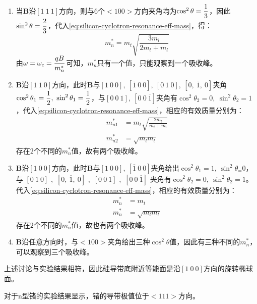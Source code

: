 \begin{enumerate}[(1)]
    \item \vspace{1ex}当$\bm B$沿$[1\ 1\ 1]$方向，则与$6$个$<100>$方向夹角均为$\cos^2\theta=\displaystyle\frac{1}{3}$，因此$\sin^2\theta=\displaystyle\frac{2}{3}$，代入\autoref{eq:silicon-cyclotron-resonance-eff-mass}，得：
    \begin{equation}
        m_n^*=m_t\sqrt{\frac{3m_l}{2m_t+m_l}}
    \end{equation}
    \vspace{1ex}由$\omega=\omega_c=\displaystyle\frac{qB}{m_n^*}$可知，$m_n^*$只有一个值，只能观察到一个吸收峰。
    \item $\bm B$沿$[1\ 1\ 0]$方向，此时$\bm B$与$[1\ 0\ 0],\ [\overline{1}\ 0\ 0],\ [0\ 1\ 0],\ [0,\ \overline{1},\ 0]$夹角$\cos^2\theta_1=\D\frac{1}{2},\ \sin^2\theta_1=\D\frac{1}{2}$，与$[0\ 0\ 1],\ [0\ 0\ \overline{1}]$夹角有$\cos^2\theta_2=0,\ \sin^2\theta_2=1$，代入\autoref{eq:silicon-cyclotron-resonance-eff-mass}，相应的有效质量分别为：
    \begin{align}
        m_{n1}^*&=m_t\sqrt{\frac{2m_l}{m_t+m_l}}\\
        m_{n2}^*&=\sqrt{m_lm_t}
    \end{align}
    存在$2$个不同的$m_n^*$值，故有两个吸收峰。
    \item $\bm B$沿$[1\ 0\ 0]$方向，此时$\bm B$与$[1\ 0\ 0],\ [\overline{1}\ 0\ 0]$夹角给出$\cos^2\theta_1=1,\ \sin^2\theta_=0$，
    与
    $[0\ 1\ 0]$
    ,\ $[0,\ \overline{1},\ 0]$
    ,\ $[0\ 0\ 1]$
    ,\ $[0\ 0\ \overline{1}]$
    夹角有$\cos^2\theta_2=0,\ \sin^2\theta_2=1$。代入\autoref{eq:silicon-cyclotron-resonance-eff-mass}，相应的有效质量分别为：
    \begin{align}
        m_n^*&=m_t\\
        m_n^*&=\sqrt{m_lm_t}
    \end{align}
    存在$2$个不同的$m_n^*$值，故也有两个吸收峰。
    \item $\bm B$沿任意方向时，与$<100>$夹角给出三种$\cos^2\theta$值，因此有三种不同的$m_n^*$，可以观察到三个吸收峰。
\end{enumerate}
上述讨论与实验结果相符，因此硅导带底附近等能面是沿$[1\ 0\ 0]$方向的旋转椭球面。

对于n型锗的实验结果显示，锗的导带极值位于$<111>$方向。























